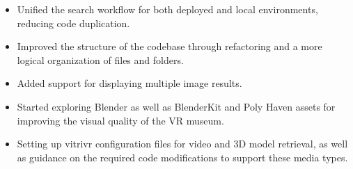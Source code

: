 \documentclass{article}
\begin{document}
\done
\begin{itemize}
    \item Unified the search workflow for both deployed and local environments, reducing code duplication.
    \item Improved the structure of the codebase through refactoring and a more logical organization of files and folders.
    \item Added support for displaying multiple image results.
    \item Started exploring Blender as well as BlenderKit and Poly Haven assets for improving the visual quality of the VR museum.
\end{itemize}

\support
\begin{itemize}
    \item Setting up vitrivr configuration files for video and 3D model retrieval, as well as guidance on the required code modifications to support these media types.
\end{itemize}

\plan
{}
\end{document}
